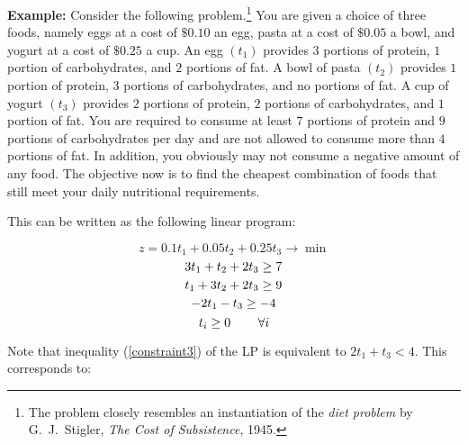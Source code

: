 \documentclass[12pt,letterpaper]{article}
\begin{document}
\vspace{3mm}

\textbf{Example: }
Consider the following problem.\footnote{The problem closely resembles an instantiation of the {\em diet problem} by G.~J.~Stigler, {\em The Cost of Subsistence}, 1945.} You are given a choice of three foods, namely eggs at a cost of $\$0.10$ an egg, pasta at a cost of $\$0.05$ a bowl, and yogurt at a cost of $\$0.25$ a cup.  An egg $(t_1)$ provides $3$ portions of protein, $1$ portion of carbohydrates, and $2$ portions of fat.  A bowl of pasta $(t_2)$ provides $1$ portion of protein, $3$ portions of carbohydrates, and no portions of fat.  A cup of yogurt $(t_3)$ provides $2$ portions of protein, $2$ portions of carbohydrates, and $1$ portion of fat.  You are required to consume at least $7$ portions of protein and $9$ portions of carbohydrates per day and are not allowed to consume more than $4$ portions of fat.  In addition, you obviously may not consume a negative amount of any food.  The objective now is to find the cheapest combination of foods that still meet your daily nutritional requirements. 

\clearpage
This can be written as the following linear program:

\begin{equation}
z = 0.1t_1 + 0.05t_2 + 0.25t_3 \to \min
\end{equation}
\begin{equation}
3t_1 + t_2 + 2t_3 \geq 7 \\
\end{equation}
\begin{equation}
t_1 + 3t_2 + 2t_3 \geq 9 \\
\end{equation}
\begin{equation}
-2t_1 - t_3 \geq -4 \\
\label{constraint3}
\end{equation}
\begin{equation}
t_i \geq 0 \hspace{0.3in} \forall i
\end{equation}

Note that inequality (\ref{constraint3}) of the LP is equivalent to $2t_1 + t_3 < 4$. This corresponds to:
\end{document}
